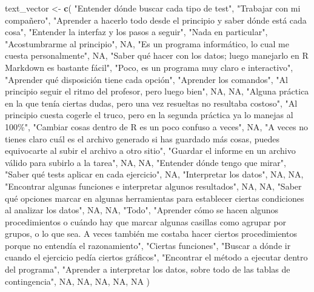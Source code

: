 \documentclass[
]{article}
\newenvironment{Shaded}{\begin{snugshade}}{\end{snugshade}}
\newcommand{\ConstantTok}[1]{\textcolor[rgb]{0.56,0.35,0.01}{#1}}
\newcommand{\FunctionTok}[1]{\textcolor[rgb]{0.13,0.29,0.53}{\textbf{#1}}}
\newcommand{\NormalTok}[1]{#1}
\newcommand{\OtherTok}[1]{\textcolor[rgb]{0.56,0.35,0.01}{#1}}
\newcommand{\StringTok}[1]{\textcolor[rgb]{0.31,0.60,0.02}{#1}}
\begin{document}
\begin{Shaded}
\begin{Highlighting}[]
\NormalTok{text\_vector }\OtherTok{\textless{}{-}} \FunctionTok{c}\NormalTok{(}
  \StringTok{"Entender dónde buscar cada tipo de test"}\NormalTok{,}
  \StringTok{"Trabajar con mi compañero"}\NormalTok{,}
  \StringTok{"Aprender a hacerlo todo desde el principio y saber dónde está cada cosa"}\NormalTok{,}
  \StringTok{"Entender la interfaz y los pasos a seguir"}\NormalTok{,}
  \StringTok{"Nada en particular"}\NormalTok{,}
  \StringTok{"Acostumbrarme al principio"}\NormalTok{,}
  \ConstantTok{NA}\NormalTok{,}
  \StringTok{"Es un programa informático, lo cual me cuesta personalmente"}\NormalTok{,}
  \ConstantTok{NA}\NormalTok{,}
  \StringTok{"Saber qué hacer con los datos; luego manejarlo en R Markdown es bastante fácil"}\NormalTok{,}
  \StringTok{"Poco, es un programa muy claro e interactivo"}\NormalTok{,}
  \StringTok{"Aprender qué disposición tiene cada opción"}\NormalTok{,}
  \StringTok{"Aprender los comandos"}\NormalTok{,}
  \StringTok{"Al principio seguir el ritmo del profesor, pero luego bien"}\NormalTok{,}
  \ConstantTok{NA}\NormalTok{,}
  \ConstantTok{NA}\NormalTok{,}
  \StringTok{"Alguna práctica en la que tenía ciertas dudas, pero una vez resueltas no resultaba costoso"}\NormalTok{,}
  \StringTok{"Al principio cuesta cogerle el truco, pero en la segunda práctica ya lo manejas al 100\%"}\NormalTok{,}
  \StringTok{"Cambiar cosas dentro de R es un poco confuso a veces"}\NormalTok{,}
  \ConstantTok{NA}\NormalTok{,}
  \StringTok{"A veces no tienes claro cuál es el archivo generado si has guardado más cosas, puedes equivocarte al subir el archivo a otro sitio"}\NormalTok{,}
  \StringTok{"Guardar el informe en un archivo válido para subirlo a la tarea"}\NormalTok{,}
  \ConstantTok{NA}\NormalTok{,}
  \ConstantTok{NA}\NormalTok{,}
  \StringTok{"Entender dónde tengo que mirar"}\NormalTok{,}
  \StringTok{"Saber qué tests aplicar en cada ejercicio"}\NormalTok{,}
  \ConstantTok{NA}\NormalTok{,}
  \StringTok{"Interpretar los datos"}\NormalTok{,}
  \ConstantTok{NA}\NormalTok{,}
  \ConstantTok{NA}\NormalTok{,}
  \StringTok{"Encontrar algunas funciones e interpretar algunos resultados"}\NormalTok{,}
  \ConstantTok{NA}\NormalTok{,}
  \ConstantTok{NA}\NormalTok{,}
  \StringTok{"Saber qué opciones marcar en algunas herramientas para establecer ciertas condiciones al analizar los datos"}\NormalTok{,}
  \ConstantTok{NA}\NormalTok{,}
  \ConstantTok{NA}\NormalTok{,}
  \StringTok{"Todo"}\NormalTok{,}
  \StringTok{"Aprender cómo se hacen algunos procedimientos o cuándo hay que marcar algunas casillas como agrupar por grupos, o lo que sea. A veces también me costaba hacer ciertos procedimientos porque no entendía el razonamiento"}\NormalTok{,}
  \StringTok{"Ciertas funciones"}\NormalTok{,}
  \StringTok{"Buscar a dónde ir cuando el ejercicio pedía ciertos gráficos"}\NormalTok{,}
  \StringTok{"Encontrar el método a ejecutar dentro del programa"}\NormalTok{,}
  \StringTok{"Aprender a interpretar los datos, sobre todo de las tablas de contingencia"}\NormalTok{,}
  \ConstantTok{NA}\NormalTok{,}
  \ConstantTok{NA}\NormalTok{,}
  \ConstantTok{NA}\NormalTok{,}
  \ConstantTok{NA}\NormalTok{,}
  \ConstantTok{NA}
\NormalTok{)}


\end{Highlighting}
\end{Shaded}
\end{document}
